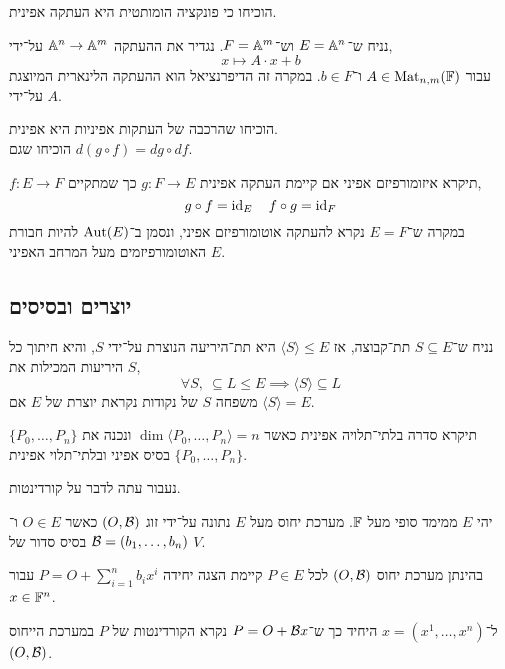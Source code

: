 \begin{exercise}
	הוכיחו כי פונקציה הומותטית היא העתקה אפינית.
\end{exercise}
\begin{example}
	נניח ש־$E = \mathbb{A}^n$ וש־$F = \mathbb{A}^m$.
	נגדיר את ההעתקה $\mathbb{A}^n \to \mathbb{A}^m$ על־ידי,
	\[
		x \mapsto A \cdot x + b
	\]
	עבור $A \in \operatorname{Mat}_{n, m}(\mathbb{F})$ ו־$b \in F$.
	במקרה זה הדיפרנציאל הוא ההעתקה הלינארית המיוצגת על־ידי $A$.
\end{example}
\begin{exercise}
	הוכיחו שהרכבה של העתקות אפיניות היא אפינית. \\
	הוכיחו שגם $d(g \circ f) = dg \circ df$.
\end{exercise}
\begin{definition}
	$f: E \to F$ תיקרא איזומורפיזם אפיני אם קיימת העתקה אפינית $g : F \to E$ כך שמתקיים,
	\[
		g \circ f = \operatorname{id}_E
		\quad
		f \circ g = \operatorname{id}_F
	\]
	במקרה ש־$E = F$ נקרא להעתקה אוטומורפיזם אפיני, ונסמן ב־$\operatorname{Aut}(E)$ להיות חבורת האוטומורפיזמים מעל המרחב האפיני $E$.
\end{definition}

\subsection{יוצרים ובסיסים}
\begin{definition}
	נניח ש־$S \subseteq E$ תת־קבוצה, אז $\langle S \rangle \le E$ היא תת־היריעה הנוצרת על־ידי $S$, והיא חיתוך כל היריעות המכילות את $S$,
	\[
		\forall S,\ \subseteq L \le E \implies \langle S \rangle \subseteq L
	\]
	משפחה $S$ של נקודות נקראת יוצרת של $E$ אם $\langle S \rangle = E$.
\end{definition}
\begin{definition}
	$\{ P_0, \ldots, P_n \}$ תיקרא סדרה בלתי־תלויה אפינית כאשר $\dim \langle P_0, \ldots, P_n \rangle = n$ ונכנה את $\{ P_0, \ldots, P_n \}$ בסיס אפיני ובלתי־תלוי אפינית.
\end{definition}
נעבור עתה לדבר על קורדינטות.
\begin{definition}
	יהי $E$ ממימד סופי מעל $\mathbb{F}$.
	מערכת יחוס מעל $E$ נתונה על־ידי זוג $(O, \mathcal{B})$ כאשר $O \in E$ ו־$\mathcal{B} = (b_1, \ldots, b_n)$ בסיס סדור של $V$.
\end{definition}
\begin{proposition}
	בהינתן מערכת יחוס $(O, \mathcal{B})$ לכל $P \in E$ קיימת הצגה יחידה $P = O + \sum_{i = 1}^n b_i x^i$ עבור $x \in \mathbb{F}^n$.
\end{proposition}
\begin{definition}[קורדינטה]
	ל־$x = (x^1, \ldots, x^n)$ היחיד כך ש־$P = O + \mathcal{B} x$ נקרא הקורדינטות של $P$ במערכת הייחוס $(O, \mathcal{B})$.
\end{definition}

\listoftheorems[title=הגדרות ומשפטים,ignoreall,show={theorem,definition},swapnumber,onlynamed={proposition,lemma}]



